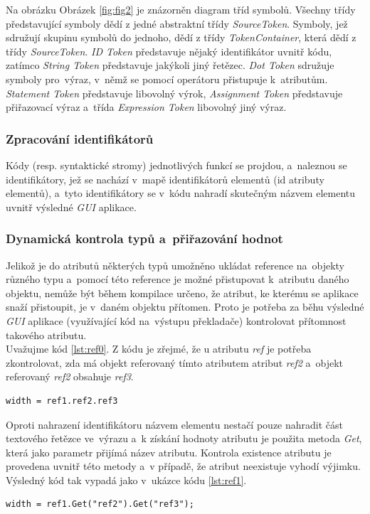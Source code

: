 \documentclass[11pt,twoside,a4paper]{book}
\begin{document}
Na obrázku Obrázek \ref{fig:fig2} je znázorněn diagram tříd symbolů. Všechny třídy představující symboly dědí z jedné abstraktní třídy \textit{SourceToken}. Symboly, jež sdružují skupinu symbolů do jednoho, dědí z třídy \textit{TokenContainer}, která dědí z třídy \textit{SourceToken}. \textit{ID Token} představuje nějaký identifikátor uvnitř kódu, zatímco \textit{String Token} představuje jakýkoli jiný řetězec. \textit{Dot Token} sdružuje symboly pro~výraz, v~němž se pomocí operátoru  přistupuje k~atributům. \textit{Statement Token} představuje libovolný výrok, \textit{Assignment Token} představuje přiřazovací výraz a~třída \textit{Expression Token} libovolný jiný výraz.

\subsubsection{Zpracování identifikátorů}
Kódy (resp. syntaktické stromy) jednotlivých funkcí se projdou, a~naleznou se identifikátory, jež se nachází v~mapě identifikátorů elementů (id atributy elementů), a~tyto identifikátory se v~kódu nahradí skutečným názvem elementu uvnitř výsledné \textit{GUI} aplikace.
\subsubsection{Dynamická kontrola typů a~přiřazování hodnot}
Jelikož je do atributů některých typů umožněno ukládat reference na~objekty různého typu a~pomocí této reference je možné přistupovat k~atributu daného objektu, nemůže být během kompilace určeno, že atribut, ke kterému se aplikace snaží přistoupit, je v~daném objektu přítomen. Proto je potřeba za běhu výsledné \textit{GUI} aplikace (využívající kód na~výstupu překladače) kontrolovat přítomnost takového atributu.\\
Uvažujme kód \ref{lst:ref0}. Z kódu je zřejmé, že u atributu \textit{ref} je potřeba zkontrolovat, zda má objekt referovaný tímto atributem atribut \textit{ref2} a~objekt referovaný \textit{ref2} obsahuje \textit{ref3}.

\begin{lstlisting}[frame=single,caption=Pseudokód problematického použití operátoru \uv{.} v~přiřazovacím výroku. \label{lst:ref0}]
width = ref1.ref2.ref3
\end{lstlisting}
Oproti nahrazení identifikátoru názvem elementu nestačí pouze nahradit část textového řetězce ve~výrazu a~k získání hodnoty atributu je použita metoda \textit{Get}, která jako parametr přijímá název atributu. Kontrola existence atributu je provedena uvnitř této metody a~v případě, že atribut neexistuje vyhodí výjimku. Výsledný kód tak vypadá jako v~ukázce kódu \ref{lst:ref1}.
\begin{lstlisting}[frame=single,caption=Řešení v~pseudokódu problematického použití operátoru \uv{.} v~přiřazovacím výroku. \label{lst:ref1}]
width = ref1.Get("ref2").Get("ref3");
\end{lstlisting}
\end{document}
